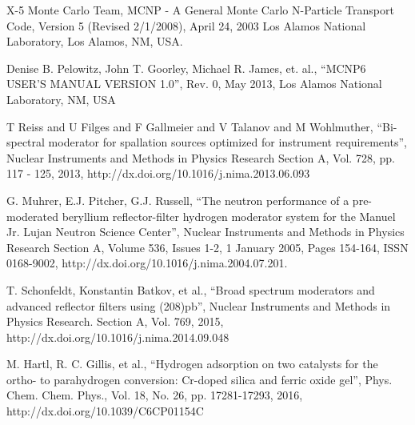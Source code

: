 \documentclass[a4paper]{jpconf}
\begin{document}
\begin{thebibliography}{9}
		X-5 Monte Carlo Team,
		MCNP - A General Monte Carlo N-Particle Transport Code, Version 5 (Revised 2/1/2008), April 24, 2003
		Los Alamos National Laboratory, Los Alamos, NM, USA.

	     Denise B. Pelowitz, John T. Goorley, Michael R. James,  et. al.,
	     ``MCNP6 USER'S MANUAL VERSION 1.0'', Rev. 0, May 2013, Los Alamos National Laboratory, NM, USA

		T Reiss and U Filges and F Gallmeier and V Talanov and M Wohlmuther,
		``Bi-spectral moderator for spallation sources optimized for instrument requirements'',
		Nuclear Instruments and Methods in Physics Research Section A, Vol. 728, pp. 117 - 125, 2013, http://dx.doi.org/10.1016/j.nima.2013.06.093

          
	  G. Muhrer, E.J. Pitcher, G.J. Russell, 
	  ``The neutron performance of a pre-moderated beryllium reflector-filter hydrogen moderator system for the Manuel Jr. Lujan Neutron Science Center'', Nuclear Instruments and Methods in Physics Research Section A, Volume 536, Issues 1-2, 1 January 2005, Pages 154-164, ISSN 0168-9002, http://dx.doi.org/10.1016/j.nima.2004.07.201.

	  T. Schonfeldt, Konstantin Batkov, et al., 
	  ``Broad spectrum moderators and advanced reflector filters using (208)pb'', Nuclear Instruments and Methods in Physics Research. Section A, Vol. 769, 2015, http://dx.doi.org/10.1016/j.nima.2014.09.048
	  
		M. Hartl, R. C. Gillis, et al.,
		``Hydrogen adsorption on two catalysts for the ortho- to parahydrogen conversion: Cr-doped silica and ferric oxide gel'', Phys. Chem. Chem. Phys., Vol. 18, No. 26, pp. 17281-17293, 2016, http://dx.doi.org/10.1039/C6CP01154C


\end{thebibliography}
\end{document}
